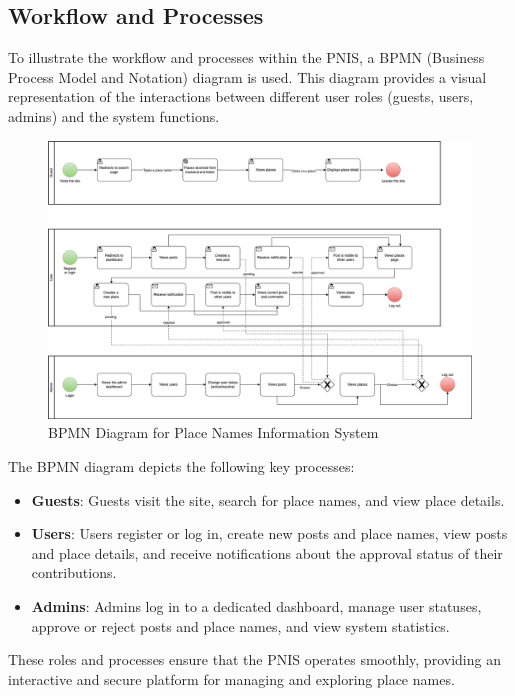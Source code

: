 \subsection{Workflow and Processes}
To illustrate the workflow and processes within the PNIS, a BPMN (Business Process Model and Notation) diagram is used. This diagram provides a visual representation of the interactions between different user roles (guests, users, admins) and the system functions.
\begin{figure}[htb]
    \centering
    \includegraphics[width=.9\textwidth, keepaspectratio]{bpmn.png}
    \caption{BPMN Diagram for Place Names Information System}
    \label{fig:bpmn}
\end{figure}

The BPMN diagram depicts the following key processes:
\begin{itemize}
    \item \textbf{Guests}: Guests visit the site, search for place names, and view place details.
    \item \textbf{Users}: Users register or log in, create new posts and place names, view posts and place details, and receive notifications about the approval status of their contributions.
    \item \textbf{Admins}: Admins log in to a dedicated dashboard, manage user statuses, approve or reject posts and place names, and view system statistics.
\end{itemize}

These roles and processes ensure that the PNIS operates smoothly, providing an interactive and secure platform for managing and exploring place names.
